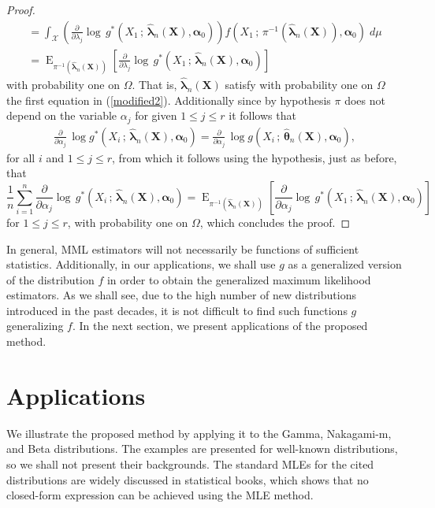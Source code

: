 \documentclass[12pt]{article} %
\newcommand{\bs}{\boldsymbol}
\newcommand{\on}{\operatorname}
\theoremstyle{definition}
\begin{document}
\begin{proof}
\begin{equation*}
\begin{aligned}
= \int_{\mathcal{X}}\left(\frac{\partial}{\partial \lambda_j}  \log\, g^*(X_1\,;\, \bs{\hat{\lambda}}_n(\bs{X}),\bs{\alpha}_0)\right)f(X_1\,;\,\pi^{-1}(\bs{\hat{\lambda}}_n(\bs{X})),\bs{\alpha}_0)\; d\mu\\
=\on{E}_{\pi^{-1}(\bs{\hat{\lambda}}_n(\bs{X}))}\left[\frac{\partial}{\partial \lambda_j}  \log\, g^*(X_1\,;\,\bs{\hat{\lambda}}_n(\bs{X}),\bs{\alpha}_0)\right]
\end{aligned}
\end{equation*}
with probability one on $\Omega$. That is, $\bs{\hat{\lambda}}_n(\bs{X})$ satisfy with probability one on $\Omega$ the first equation in (\ref{modified2}).
Additionally since by hypothesis $\pi$ does not depend on the variable $\alpha_j$ for given $1\leq j\leq r$ it follows that
\begin{equation*}
\begin{aligned}
\frac{\partial}{\partial \alpha_j}\, \log g^*(X_i\,;\,\bs{\hat{\lambda}}_n(\bs{X}),\bs{\alpha}_0)  =  \frac{\partial}{\partial \alpha_j}\, \log g(X_i\,;\,\bs{\hat{\theta}}_n(\bs{X}),\bs{\alpha}_0),
\end{aligned}
\end{equation*}
for all $i$ and $1\leq j\leq r$, from which it follows using the hypothesis, just as before, that
\begin{equation*}
\frac{1}{n}
\sum_{i=1}^n \frac{\partial}{\partial \alpha_j}  \log\, g^*(X_i\,;\,\bs{\hat{\lambda}}_n(\bs{X}),\bs{\alpha}_0)=\on{E}_{\pi^{-1}(\bs{\hat{\lambda}}_n(\bs{X}))}\left[\frac{\partial}{\partial \alpha_j}  \log\, g^*(X_1\,;\,\bs{\hat{\lambda}}_n(\bs{X}),\bs{\alpha}_0)\right]
\end{equation*}
for $1\leq j\leq r$, with probability one on $\Omega$, which concludes the proof.
\end{proof}
In general, MML estimators will not necessarily be functions of sufficient statistics. Additionally, in our applications, we shall use $g$ as a generalized version of the distribution $f$ in order to obtain the generalized maximum likelihood estimators. As we shall see, due to the high number of new distributions introduced in the past decades, it is not difficult to find such functions $g$ generalizing $f$. In the next section, we present applications of the proposed method.


\section{Applications}


We illustrate the proposed method by applying it to the Gamma, Nakagami-m, and Beta distributions. The examples are presented for well-known distributions, so we shall not present their backgrounds. The standard MLEs for the cited distributions are widely discussed in statistical books, which shows that no closed-form expression can be achieved using the MLE method.
\end{document}
